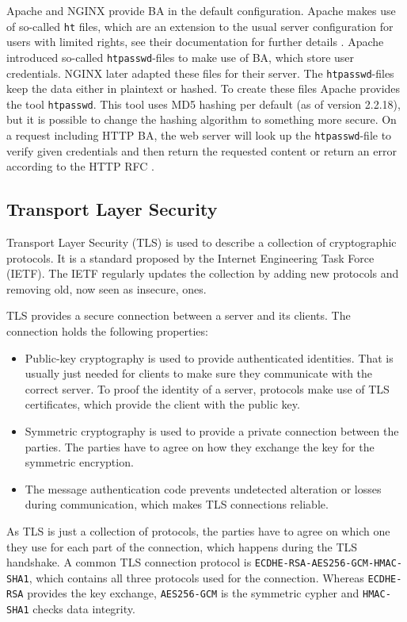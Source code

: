 Apache and NGINX provide BA in the default configuration. Apache makes use of
so-called \texttt{ht} files, which are an extension to the usual server
configuration for users with limited rights, see their documentation for further
details . Apache introduced so-called
\texttt{htpasswd}-files to make use of BA, which store user credentials. NGINX
later adapted these files for their server. The \texttt{htpasswd}-files keep the
data either in plaintext or hashed. To create these files Apache provides the
tool \texttt{htpasswd}. This tool uses MD5
hashing per default (as of version 2.2.18), but it is possible to change the
hashing algorithm to something more secure. On a request including HTTP BA, the
web server will look up the \texttt{htpasswd}-file to verify given credentials
and then return the requested content or return an error according to the HTTP
RFC .

\subsection{Transport Layer Security}

Transport Layer Security (TLS) is used to describe a collection of cryptographic
protocols. It is a standard proposed by the Internet Engineering Task Force
(IETF). The IETF regularly updates the collection by adding new protocols and
removing old, now seen as insecure, ones.

TLS provides a secure connection between a server and its clients. The
connection holds the following properties:
\begin{itemize}
  \item Public-key cryptography is used to provide authenticated identities.
  That is usually just needed for clients to make sure they communicate with the
  correct server. To proof the identity of a server, protocols make use of TLS
  certificates, which provide the client with the public key.
  \item Symmetric cryptography is used to provide a private connection between
  the parties. The parties have to agree on how they exchange the key for the
  symmetric encryption.
  \item The message authentication code prevents undetected alteration
  or losses during communication, which makes TLS connections reliable.
\end{itemize}

As TLS is just a collection of protocols, the parties have to agree on which one
they use for each part of the connection, which happens during the TLS
handshake. A common TLS connection protocol is
\texttt{ECDHE-RSA-AES256-GCM-HMAC-SHA1}, which contains all three protocols used
for the connection. Whereas \texttt{ECDHE-RSA} provides the key exchange,
\texttt{AES256-GCM} is the  symmetric cypher and \texttt{HMAC-SHA1} checks data
integrity.

